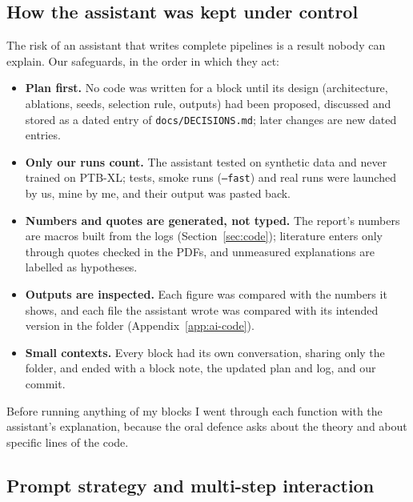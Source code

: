 \subsection{How the assistant was kept under control}

The risk of an assistant that writes complete pipelines is a result nobody can explain. Our safeguards, in
the order in which they act:
\begin{itemize}[leftmargin=1.2em,itemsep=1pt]
  \item \textbf{Plan first.} No code was written for a block until its design (architecture, ablations,
        seeds, selection rule, outputs) had been proposed, discussed and stored as a dated entry of
        \texttt{docs/DECISIONS.md}; later changes are new dated entries.
  \item \textbf{Only our runs count.} The assistant tested on synthetic data and never trained on PTB-XL;
        tests, smoke runs (\texttt{--fast}) and real runs were launched by us, mine by me, and their output
        was pasted back.
  \item \textbf{Numbers and quotes are generated, not typed.} The report's numbers are macros built from the
        logs (Section~\ref{sec:code}); literature enters only through quotes checked in the PDFs, and
        unmeasured explanations are labelled as hypotheses.
  \item \textbf{Outputs are inspected.} Each figure was compared with the numbers it shows, and each file the
        assistant wrote was compared with its intended version in the folder (Appendix~\ref{app:ai-code}).
  \item \textbf{Small contexts.} Every block had its own conversation, sharing only the folder, and ended with
        a block note, the updated plan and log, and our commit.
\end{itemize}
Before running anything of my blocks I went through each function with the assistant's explanation,
because the oral defence asks about the theory and about specific lines of the code.

\subsection{Prompt strategy and multi-step interaction}

